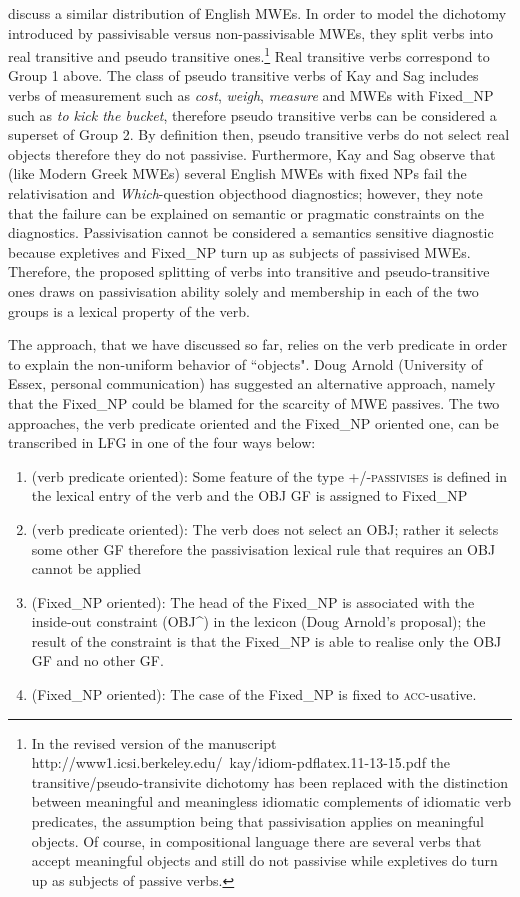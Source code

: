 \documentclass[output=paper]{langsci/langscibook}
\begin{document}
\citet{kaysagidioms} discuss a similar distribution of English MWEs. In order to model the dichotomy introduced by passivisable versus non-passivisable MWEs, they split verbs into real transitive and pseudo transitive ones.\footnote{In the revised version of the manuscript http://www1.icsi.berkeley.edu/~kay/idiom-pdflatex.11-13-15.pdf the transitive/pseudo-transivite dichotomy has been replaced with the distinction between meaningful and meaningless idiomatic complements of idiomatic verb predicates, the assumption being that passivisation applies on meaningful objects. Of course, in compositional language there are several verbs that accept meaningful objects and still do not passivise while expletives do turn up as subjects of passive verbs.} Real transitive verbs correspond to Group 1 above. The class of pseudo transitive verbs of Kay and Sag includes verbs of measurement such as \textit{cost}, \textit{weigh}, \textit{measure} and MWEs with Fixed\_NP such as \textit{to kick the bucket}, therefore pseudo transitive verbs can be considered a superset of Group 2. By definition then, pseudo transitive verbs do not select real objects therefore they do not passivise.  Furthermore, Kay and Sag observe that (like Modern Greek MWEs) several English MWEs with fixed NPs fail the relativisation and \textit{Which}-question objecthood diagnostics; however, they note that the failure can be explained on semantic or pragmatic constraints on the diagnostics. Passivisation cannot be considered a semantics sensitive diagnostic because expletives and Fixed\_NP turn up as subjects of passivised MWEs. Therefore, the proposed splitting of verbs into transitive and pseudo-transitive ones draws on passivisation ability solely and membership in each of the two groups is a lexical property of the verb. 

The \cite{kaysagidioms} approach, that we have discussed so far,  relies on the verb predicate in order to explain the non-uniform behavior of ``objects". Doug Arnold (University of Essex, personal communication) has suggested an alternative approach, namely that the Fixed\_NP could be blamed for the scarcity of MWE passives. The two approaches, the verb predicate oriented and the Fixed\_NP oriented one, can be transcribed in LFG in one of the four ways below:

\begin{enumerate}
\item  (verb predicate oriented): Some feature of the type \textsc{+/-passivises} is defined in the lexical entry of the verb and the OBJ GF is assigned to Fixed\_NP
\item (verb predicate oriented): The verb does not select an OBJ; rather it selects some other GF therefore the passivisation lexical rule that requires an OBJ cannot be applied
\item (Fixed\_NP oriented): The head of the Fixed\_NP is associated with the inside-out constraint (OBJ\^{}) in the lexicon (Doug Arnold's proposal); the result of the constraint is that the Fixed\_NP is able to realise only the OBJ GF and no other GF. 
\item (Fixed\_NP oriented): The case of the Fixed\_NP  is fixed to \textsc{acc}-usative.
\end{enumerate}
\end{document}

